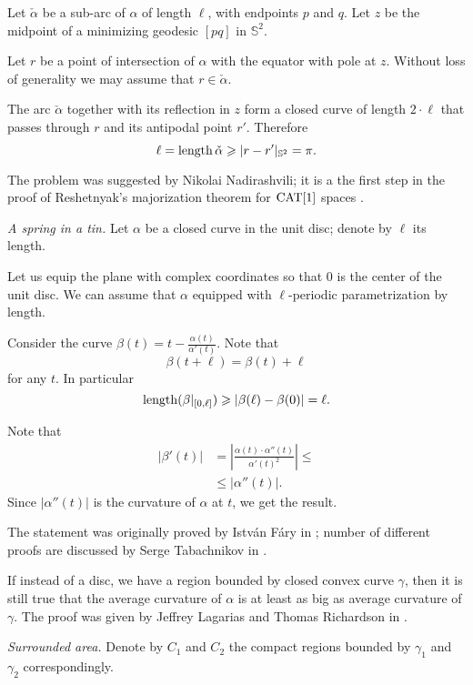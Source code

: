 Let $\check\alpha$ be a sub-arc of $\alpha$ of length $\ell$, with endpoints $p$ and $q$.  
Let $z$ be the midpoint of a minimizing geodesic $[pq]$ in $\mathbb{S}^2$.  

Let $r$ be a point of intersection of $\alpha$ with the equator with pole at $z$.  
Without loss of generality we may assume that $r\in\check\alpha$. 

The arc $\check\alpha$ together with its reflection in $z$ 
form a closed curve of length $2\cdot \ell$ 
that passes through $r$ and its antipodal point $r'$.
Therefore 
\[\ell=\operatorname{\rm length} \check\alpha\geqslant |r-r'|_{\mathbb S^2}=\pi.\]

The problem was suggested by Nikolai Nadirashvili;
it is a the first step 
in the proof of Reshetnyak's majorization theorem for $\operatorname{\rm CAT}\nolimits[1]$ spaces  \cite[see][]{akp}.
 


 \textit{A spring in a tin.}
Let $\alpha$ be a closed curve in the unit disc;
denote by $\ell$ its length.

Let us equip the plane with complex coordinates so that $0$ is the center of the unit disc.
We can assume that $\alpha$ equipped with $\ell$-periodic parametrization by length.

Consider the curve $\beta(t)=t-\tfrac{\alpha(t)}{\alpha'(t)}$.
Note that 
\[\beta(t+\ell)=\beta(t)+\ell\] 
for any $t$.
In particular 
\[\operatorname{\rm length} (\beta|_{[0,\ell]}) 
\geqslant 
|\beta(\ell)-\beta(0)|
=
\ell.\]

Note that 
\begin{align*}
|\beta'(t)|&=|\tfrac{\alpha(t)\cdot\alpha''(t)}{\alpha'(t)^2}|\le
\\
&\le|\alpha''(t)|.
\end{align*}
Since $|\alpha''(t)|$ is the curvature of $\alpha$ at $t$,
we get the result.

The statement was originally proved 
by Istv\'an F\'ary in \cite{fary};
number of different proofs are discussed by Serge Tabachnikov in \cite{tabachnikov}.

If instead of a disc, 
we have a region bounded by closed convex curve $\gamma$, 
then it is still true that the average curvature of $\alpha$ is at least as big as average curvature of $\gamma$. 
The proof was given by Jeffrey Lagarias
and Thomas Richardson in \cite{lagarias-richardson}.

\textit{Surrounded area.}
Denote by $C_1$ and $C_2$ the compact regions bounded by $\gamma_1$ and $\gamma_2$ correspondingly.

